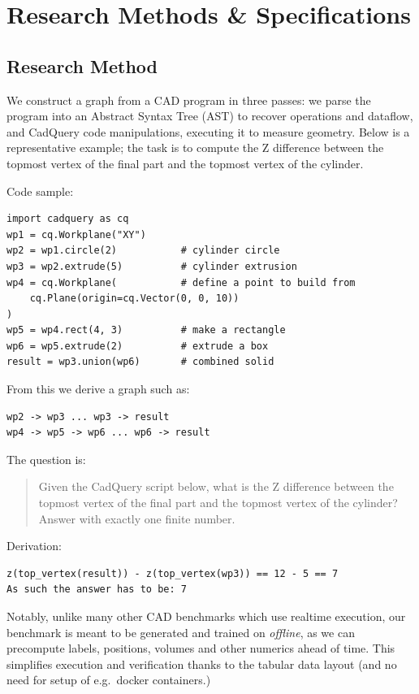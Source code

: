 \documentclass[10pt]{article}
\begin{document}
\section{Research Methods \& Specifications}

\subsection{Research Method}

We construct a graph from a CAD program in three passes: we parse the program into an Abstract Syntax Tree (AST) to recover operations and dataflow, and CadQuery code manipulations, executing it to measure geometry. Below is a representative example; the task is to compute the Z difference between the topmost vertex of the final part and the topmost vertex of the cylinder.

Code sample:

\begin{verbatim}
import cadquery as cq
wp1 = cq.Workplane("XY")
wp2 = wp1.circle(2)           # cylinder circle
wp3 = wp2.extrude(5)          # cylinder extrusion
wp4 = cq.Workplane(           # define a point to build from
    cq.Plane(origin=cq.Vector(0, 0, 10))
)
wp5 = wp4.rect(4, 3)          # make a rectangle
wp6 = wp5.extrude(2)          # extrude a box
result = wp3.union(wp6)       # combined solid
\end{verbatim}

From this we derive a graph such as:

\begin{verbatim}
wp2 -> wp3 ... wp3 -> result
wp4 -> wp5 -> wp6 ... wp6 -> result
\end{verbatim}

The question is:

\begin{quote}
Given the CadQuery script below, what is the Z difference between the topmost vertex of the final part and the topmost vertex of the cylinder? Answer with exactly one finite number.
\end{quote}

Derivation:

\begin{verbatim}
z(top_vertex(result)) - z(top_vertex(wp3)) == 12 - 5 == 7
As such the answer has to be: 7
\end{verbatim}

Notably, unlike many other CAD benchmarks which use realtime execution, our benchmark is meant to be generated and trained on \textit{offline}, as we can precompute labels, positions, volumes and other numerics ahead of time. This simplifies execution and verification thanks to the tabular data layout (and no need for setup of e.g.\ docker containers.)
\end{document}
